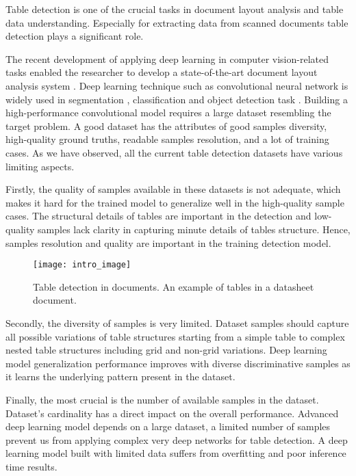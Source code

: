 \documentclass[a4paper,conference]{IEEEtran}
\begin{document}
Table detection is one of the crucial tasks in document layout analysis and table data understanding. Especially for extracting data from scanned documents table detection plays a significant role. 

The recent development of applying deep learning in computer vision-related tasks enabled the researcher to develop a state-of-the-art document layout analysis system \cite{layout1, layout2}. Deep learning technique such as convolutional neural network is widely used in segmentation \cite{rethink}, classification \cite{clf2, clf1} and object detection task \cite{maskrcnn}. Building a high-performance convolutional model requires a large dataset resembling the target problem. A good dataset has the attributes of good samples diversity, high-quality ground truths, readable samples resolution, and a lot of training cases. As we have observed, all the current table detection datasets have various limiting aspects. 
 
 Firstly, the quality of samples available in these datasets is not adequate, which makes it hard for the trained model to generalize well in the high-quality sample cases. The structural details of tables are important in the detection and low-quality samples lack clarity in capturing minute details of tables structure.  Hence, samples resolution and quality are important in the training detection model.
 
 \begin{figure}[h]
  \centering
      \texttt{[image: intro\_image]}
\caption{Table detection in documents. An example of tables in a datasheet document.}
\label{fig:intro}
\end{figure}
 
 Secondly, the diversity of samples is very limited. Dataset samples should capture all possible variations of table structures starting from a simple table to complex nested table structures including grid and non-grid variations. Deep learning model generalization performance improves with diverse discriminative samples as it learns the underlying pattern present in the dataset.                                                                
 


Finally, the most crucial is the number of available samples in the dataset. Dataset's cardinality has a direct impact on the overall performance. Advanced deep learning model depends on a large dataset, a limited number of samples prevent us from applying complex very deep networks for table detection. A deep learning model built with limited data suffers from overfitting and poor inference time results.
 
\end{document}
